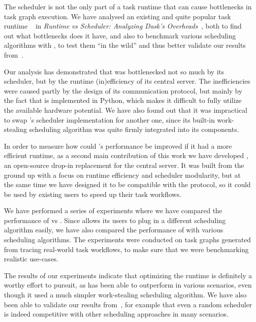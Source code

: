 

The scheduler is not the only part of a task runtime that can cause bottlenecks in task graph
execution. We have analysed an existing and quite popular task runtime
\dask{}~\cite{dask} in \emph{Runtime vs Scheduler: Analyzing Dask's Overheads}~\cite{rsds},
both to find out what bottlenecks does it have, and also to benchmark various scheduling algorithms
with \dask{}, to test them ``in the wild'' and thus better validate our results
from~\cite{estee}.

Our analysis has demonstrated that \dask{} was bottlenecked not so much by its
scheduler, but by the runtime (in)efficiency of its central server. The inefficiencies were caused
partly by the design of its communication protocol, but mainly by the fact that
\dask{} is implemented in Python, which makes it difficult to fully utilize the
available hardware potential. We have also found out that it was impractical to swap
\dask{}'s scheduler implementation for another one, since its built-in work-stealing
scheduling algorithm was quite firmly integrated into its components.

In order to measure how could \dask{}'s performance be improved if it had a more
efficient runtime, as a second main contribution of this work we have developed
\rsds{}, an open-source drop-in replacement for the \dask{} central
server. It was built from the ground up with a focus on runtime efficiency
and scheduler modularity, but at the same time we have designed it to be compatible with the
\dask{} protocol, so it could be used by existing \dask{} users to
speed up their task workflows.

We have performed a series of experiments where we have compared the performance of
\rsds{} vs \dask{}. Since \rsds{} allows its users to
plug in a different scheduling algorithm easily, we have also compared the performance of
\rsds{} with various scheduling algorithms. The experiments were conducted on task
graphs generated from tracing real-world \dask{} task workflows, to make sure that
we were benchmarking realistic use-cases.

The results of our experiments indicate that optimizing the runtime is definitely a worthy effort
to pursuit, as \rsds{} has been able to outperform \dask{} in various
scenarios, even though it used a much simpler work-stealing scheduling algorithm. We have also been
able to validate our results from~\cite{estee}, for example that even a random scheduler
is indeed competitive with other scheduling approaches in many scenarios.


